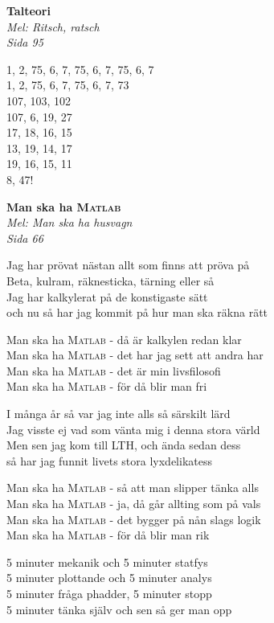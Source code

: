 \documentclass[10pt]{article}
\newenvironment{song}[2]{
	\textbf{#1}\\
	\emph{#2}\par
	\vspace{-1mm}
}{
	\vspace{2mm}
}
\begin{document}
\begin{multicols*}{2}
\begin{song}{Talteori}{Mel: Ritsch, ratsch\\Sida 95}
	1, 2, 75, 6, 7, 75, 6, 7, 75, 6, 7\\
	1, 2, 75, 6, 7, 75, 6, 7, 73\\
	107, 103, 102\\
	107, 6, 19, 27\\
	17, 18, 16, 15\\
	13, 19, 14, 17\\
	19, 16, 15, 11\\
	8, 47!
\end{song}

\vfill
\columnbreak

\begin{song}{Man ska ha \textsc{Matlab}}{Mel: Man ska ha husvagn\\Sida 66}
	Jag har prövat nästan allt som finns att pröva på\\
	Beta, kulram, räknesticka, tärning eller så\\
	Jag har kalkylerat på de konstigaste sätt\\
	och nu så har jag kommit på hur man ska räkna rätt

	Man ska ha \textsc{Matlab} - då är kalkylen redan klar\\
	Man ska ha \textsc{Matlab} - det har jag sett att andra har\\
	Man ska ha \textsc{Matlab} - det är min livsfilosofi\\
	Man ska ha \textsc{Matlab} - för då blir man fri

	I många år så var jag inte alls så särskilt lärd\\
	Jag visste ej vad som vänta mig i denna stora värld\\
	Men sen jag kom till LTH, och ända sedan dess \\
	så har jag funnit livets stora lyxdelikatess

	Man ska ha \textsc{Matlab} - så att man slipper tänka alls\\
	Man ska ha \textsc{Matlab} - ja, då går allting som på vals\\
	Man ska ha \textsc{Matlab} - det bygger på nån slags logik\\
	Man ska ha \textsc{Matlab} - för då blir man rik

	5 minuter mekanik och 5 minuter statfys\\
	5 minuter plottande och 5 minuter analys\\
	5 minuter fråga phadder, 5 minuter stopp\\
	5 minuter tänka själv och sen så ger man opp


\end{song}
\end{multicols*}
\end{document}
